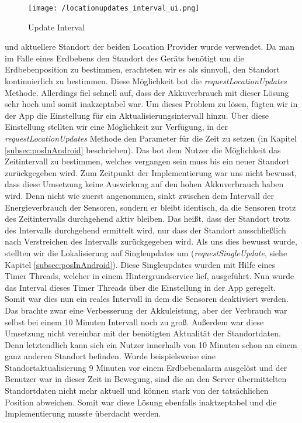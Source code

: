 \begin{wrapfigure}{r}{50mm}
\centering
   \texttt{[image: /locationupdates\_interval\_ui.png]} 
   \caption[Lokalisierung: Update Interval]{Update Interval}
\end{wrapfigure}

und aktuellere Standort der beiden Location Provider wurde verwendet. Da man im Falle eines Erdbebens den Standort des Geräts benötigt um die Erdbebenposition zu bestimmen, erachteten wir es als sinnvoll, den Standort kontinuierlich zu bestimmen. Diese Möglichkeit bot die \textit{requestLocationUpdates} Methode. Allerdings fiel schnell auf, dass der Akkuverbrauch mit dieser Lösung sehr hoch und somit inakzeptabel war. Um dieses Problem zu lösen, fügten wir in der App die Einstellung für ein Aktualisierungsintervall hinzu. Über diese Einstellung stellten wir eine Möglichkeit zur Verfügung, in der \textit{requestLocationUpdates} Methode den Parameter für die Zeit zu setzen (in Kapitel \ref{subsec:posInAndroid} beschrieben). Das bot dem Nutzer die Möglichkeit das Zeitintervall zu bestimmen, welches vergangen sein muss bis ein neuer Standort zurückgegeben wird. Zum Zeitpunkt der Implementierung war uns nicht bewusst, dass diese Umsetzung keine Auswirkung auf den hohen Akkuverbrauch haben wird. Denn nicht wie zuerst angenommen, sinkt zwischen dem Intervall der Energieverbrauch der Sensoren, sondern er bleibt identisch, da die Sensoren trotz des Zeitintervalls durchgehend aktiv bleiben.
Das heißt, dass der Standort trotz des Intervalls durchgehend ermittelt wird, nur dass der Standort ausschließlich nach Verstreichen des Intervalls zurückgegeben wird.
Als uns dies bewusst wurde, stellten wir die Lokalisierung auf Singleupdates um (\textit{requestSingleUpdate}, siehe Kapitel \ref{subsec:posInAndroid}). Diese Singleupdates wurden mit Hilfe eines Timer Threads, welcher in einem Hintergrundservice lief, ausgeführt. Nun wurde das Interval dieses Timer Threads über die Einstellung in der App geregelt. Somit war dies nun ein reales Intervall in dem die Sensoren deaktiviert werden. 
Das brachte zwar eine Verbesserung der Akkuleistung, aber der Verbrauch war selbst bei einem 10 Minuten Intervall noch zu groß. Außerdem war diese Umsetzung nicht vereinbar mit der benötigten Aktualität der Standortdaten. Denn letztendlich kann sich ein Nutzer innerhalb von 10 Minuten schon an einem ganz anderen Standort befinden. Wurde beispielsweise eine Standortaktualisierung 9 Minuten vor einem Erdbebenalarm ausgelöst und der Benutzer war in dieser Zeit in Bewegung, sind die an den Server übermittelten Standortdaten nicht mehr aktuell und können stark von der tatsächlichen Position abweichen. Somit war diese Lösung ebenfalls inaktzeptabel und die Implementierung musste überdacht werden.

